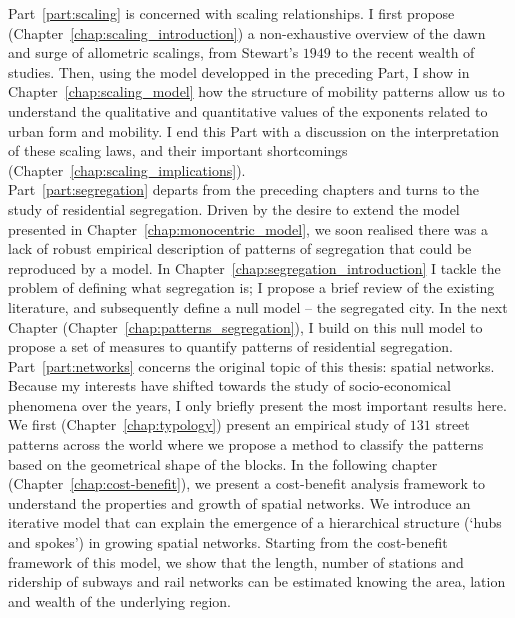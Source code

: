 Part~\ref{part:scaling} is concerned with scaling relationships. I first propose
(Chapter~\ref{chap:scaling_introduction}) a non-exhaustive overview of the dawn
and surge of allometric scalings, from Stewart's $1949$ to the recent wealth of
studies. Then, using the model developped in the preceding Part, I show in
Chapter~\ref{chap:scaling_model} how the structure of mobility patterns allow us
to understand the qualitative and quantitative values of the exponents related
to urban form and mobility. I end this Part with a discussion on the
interpretation of these scaling laws, and their important shortcomings
(Chapter~\ref{chap:scaling_implications}).\\

Part~\ref{part:segregation} departs from the preceding chapters and turns to the
study of residential segregation. Driven by the desire to extend the model
presented in Chapter~\ref{chap:monocentric_model}, we soon realised there was a
lack of robust empirical description of patterns of segregation that could be
reproduced by a model. In Chapter~\ref{chap:segregation_introduction} I tackle
the problem of defining what segregation is; I propose a brief review of the
existing literature, and subsequently define a null model -- the segregated
city. In the next Chapter (Chapter~\ref{chap:patterns_segregation}), I build on
this null model to propose a set of measures to quantify patterns of residential
segregation.\\

Part~\ref{part:networks} concerns the original topic of this thesis: spatial
networks. Because my interests have shifted towards the study of
socio-economical phenomena over the years, I only briefly present the most
important results here. We first (Chapter~\ref{chap:typology}) present an empirical
study of $131$ street patterns across the world where we propose a method to
classify the patterns based on the geometrical shape of the blocks. In the
following chapter (Chapter~\ref{chap:cost-benefit}), we present a cost-benefit
analysis framework to understand the properties and growth of spatial networks.
We introduce an iterative model that can explain the emergence of a hierarchical
structure (`hubs and spokes') in growing spatial networks. Starting from the
cost-benefit framework of this model, we show that the length, number of
stations and ridership of subways and rail networks can be estimated knowing the
area, lation and wealth of the underlying region.\\


